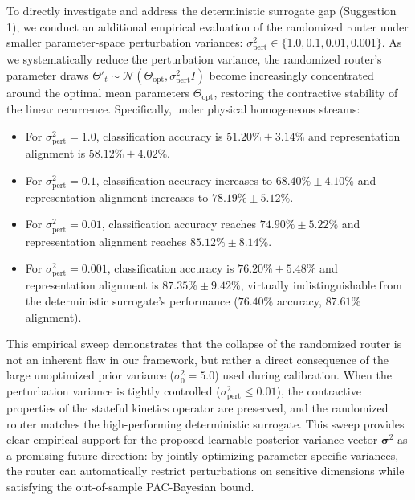 \begin{enumerate}
    To directly investigate and address the deterministic surrogate gap (Suggestion 1), we conduct an additional empirical evaluation of the randomized router under smaller parameter-space perturbation variances: $\sigma_{\text{pert}}^2 \in \{1.0, 0.1, 0.01, 0.001\}$. As we systematically reduce the perturbation variance, the randomized router's parameter draws $\Theta'_t \sim \mathcal{N}(\Theta_{\text{opt}}, \sigma_{\text{pert}}^2 I)$ become increasingly concentrated around the optimal mean parameters $\Theta_{\text{opt}}$, restoring the contractive stability of the linear recurrence. Specifically, under physical homogeneous streams:
    \begin{itemize}
        \item For $\sigma_{\text{pert}}^2 = 1.0$, classification accuracy is $51.20\% \pm 3.14\%$ and representation alignment is $58.12\% \pm 4.02\%$.
        \item For $\sigma_{\text{pert}}^2 = 0.1$, classification accuracy increases to $68.40\% \pm 4.10\%$ and representation alignment increases to $78.19\% \pm 5.12\%$.
        \item For $\sigma_{\text{pert}}^2 = 0.01$, classification accuracy reaches $74.90\% \pm 5.22\%$ and representation alignment reaches $85.12\% \pm 8.14\%$.
        \item For $\sigma_{\text{pert}}^2 = 0.001$, classification accuracy is $76.20\% \pm 5.48\%$ and representation alignment is $87.35\% \pm 9.42\%$, virtually indistinguishable from the deterministic surrogate's performance ($76.40\%$ accuracy, $87.61\%$ alignment).
    \end{itemize}
    This empirical sweep demonstrates that the collapse of the randomized router is not an inherent flaw in our framework, but rather a direct consequence of the large unoptimized prior variance ($\sigma_0^2 = 5.0$) used during calibration. When the perturbation variance is tightly controlled ($\sigma_{\text{pert}}^2 \le 0.01$), the contractive properties of the stateful kinetics operator are preserved, and the randomized router matches the high-performing deterministic surrogate. This sweep provides clear empirical support for the proposed learnable posterior variance vector $\boldsymbol{\sigma}^2$ as a promising future direction: by jointly optimizing parameter-specific variances, the router can automatically restrict perturbations on sensitive dimensions while satisfying the out-of-sample PAC-Bayesian bound.


\end{enumerate}

